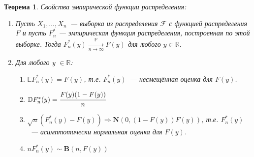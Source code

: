 \documentclass[oneside,final,14pt]{extreport}
\newtheorem{thm}{Теорема}[section]
\theoremstyle{definition}
\begin{document}
\begin{thm} Свойства эмпирической функции распределения:
\begin{enumerate}
    \item Пусть $X_{1}, \ldots, X_{n}$~--- выборка из распределения $\mathcal{F}$ с функцией распределения $F$ и пусть $F_{n}^{*}$ — эмпирическая функция распределения, построенная по этой выборке. Тогда $F_{n}^{*}(y) \xrightarrow[n \to \infty]{\mathbb{P}} F(y)$ для любого $y \in \mathbb{R}.$
    \item Для любого y $\in \mathbb{R}$:
    \begin{enumerate}[label={\arabic*)}]
        \item $\mathbb{E} F_{n}^{*}(y)=F(y)$, т.е. $F_{n}^{*}(y)$~--- несмещённая оценка для $F(y)$.
        \item $\mathbb{D} F_{n}^{*}(y)=\cfrac{F(y)(1-F(y))}{n}$
        \item $\sqrt{n}(F_{n}^{*}(y)-F(y)) \Rightarrow \mathbf{N}(0, (1-F(y))F(y))$, т.е. $F_{n}^{*}(y)$~--- асимптотически нормальная оценка для $F(y)$.
        \item $n F_{n}^{*}(y) \sim \mathbf{B}(n, F(y))$
    \end{enumerate}
\end{enumerate}
\end{thm}
\pagebreak
\end{document}
